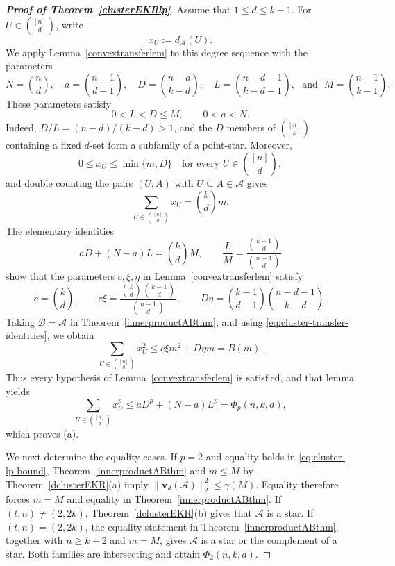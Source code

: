 \documentclass[10pt,a4paper]{amsart}
\numberwithin{equation}{section}
\def\A{\mathcal{A}}
\def\v{\mathbf{v}}
\begin{document}
\begin{proof}[{\bf Proof of Theorem~\ref{clusterEKRlp}}]
Assume that $1\leq d\leq k-1$.
For $U\in\binom{[n]}d$, write
	\[
	x_U:=d_\A(U).
	\]
We apply Lemma~\ref{convextransferlem} to this degree sequence with the parameters
\begin{equation}\label{eq:cluster-transfer-parameters}
N=\binom nd, \quad a =\binom{n-1}{d-1}, \quad D=\binom{n-d}{k-d},	\quad
L =\binom{n-d-1}{k-d-1}, \text{~ and ~}M =\binom{n-1}{k-1}.
	\end{equation}
	These parameters satisfy
	\[
	0<L<D\leq M,
	\qquad
	0<a<N.
	\]
Indeed, $D/L=(n-d)/(k-d)>1$, and the $D$ members of $\binom{[n]}k$ containing a fixed $d$-set form a subfamily of a point-star.
Moreover,
	\[
	0\leq x_U\leq\min\{m,D\}
	\quad\text{for every }U\in\binom{[n]}d,
	\]
and double counting the pairs $(U,A)$ with $U\subseteq A\in\A$ gives
	\begin{equation}\label{eq:cluster-first-moment}
		\sum_{U\in\binom{[n]}d}x_U=\binom kd m.
	\end{equation}
The elementary identities
	\[
	aD+(N-a)L=\binom kd M,
	\qquad
	\frac LM=\frac{\binom{k-1}d}{\binom{n-1}d}
	\]
show that the parameters $c,\xi,\eta$ in
Lemma~\ref{convextransferlem} satisfy
	\begin{equation}\label{eq:cluster-transfer-identities}
		c=\binom kd,
		\qquad
		c\xi=\frac{\binom kd\binom{k-1}d}{\binom{n-1}d},
		\qquad
		D\eta=\binom{k-1}{d-1}\binom{n-d-1}{k-d}.
	\end{equation}
	Taking $\mathcal B=\mathcal A$ in
	Theorem~\ref{innerproductABthm}, and using
	\eqref{eq:cluster-transfer-identities}, we obtain
	\begin{equation}\label{eq:cluster-second-moment}
		\sum_{U\in\binom{[n]}d}x_U^2
		\leq c\xi m^2+D\eta m= B(m).
	\end{equation}
	Thus every hypothesis of Lemma~\ref{convextransferlem} is satisfied,
	and that lemma yields
	\[
	\sum_{U\in\binom{[n]}d}x_U^p
	\leq aD^p+(N-a)L^p
	=\Phi_p(n,k,d),
	\]
which proves (a). %
	

We next determine the equality cases.
If $p=2$ and equality holds in \eqref{eq:cluster-lp-bound}, Theorem~\ref{innerproductABthm} and $m\leq M$ by Theorem~\ref{dclusterEKR}(a) imply
$\|\v_d(\A)\|_2^2\leq \gamma(M).$
Equality therefore forces $m=M$ and equality in
Theorem~\ref{innerproductABthm}.
If $(t,n)\neq(2,2k)$,
Theorem~\ref{dclusterEKR}(b) gives that $\A$ is a star.  If
	$(t,n)=(2,2k)$, the equality statement in
Theorem~\ref{innerproductABthm}, together with $n\geq k+2$ and
$m=M$,
gives $\A$ is a star or the complement of a star.
Both families are intersecting and attain $\Phi_2(n,k,d)$.
	

\end{proof}
\end{document}
